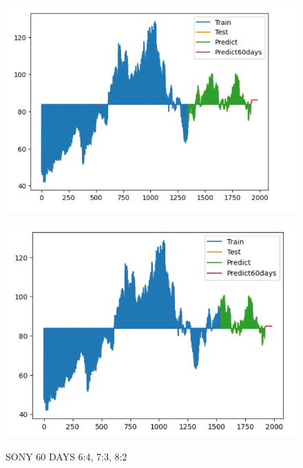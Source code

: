 \documentclass{article}
\begin{document}
\begin{multicols}{2}
\begin{figure}[H]
\begin{minipage}{0.15\textwidth}
    \label{fig:1}
    \end{minipage}%
    \begin{minipage}{0.15\textwidth}
    \centering
    \includegraphics[width=1\textwidth]{Image/GradientBoosting/SONY_60_7_3_GradientBoostingRegressor.png}
  
    \label{fig:2}
    \end{minipage}%
    \begin{minipage}{0.15\textwidth}
    \centering
    \includegraphics[width=1\textwidth]{Image/GradientBoosting/SONY_60_8_2_GradientBoostingRegressor.png}

    \label{fig:3}
    \end{minipage}
    \caption{SONY 60 DAYS  6:4, 7:3, 8:2 }
\end{figure}



\end{multicols}
\end{document}
